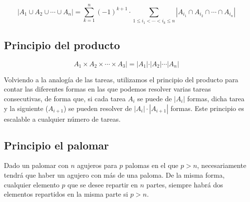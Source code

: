 \[|A_1 \cup A_2 \cup \cdots \cup A_n| = \sum_{k=1}^{n} {(-1)}^{k+1} \cdot \sum_{1 \leq i_1 < \cdots < i_k \leq n} |A_{i_1} \cap A_{i_2} \cap \cdots \cap A_{i_n}|\]

\subsection{Principio del producto}\label{principio-del-producto}

\[A_1 \times A_2 \times \cdots \times A_3| = |A_1| \cdot |A_2| \cdots |A_n|\]

Volviendo a la analogía de las tareas, utilizamos el principio del producto para contar las diferentes formas en las que podemos resolver varias tareas consecutivas, de forma que, si cada tarea $A_i$ se puede de $|A_i|$ formas, dicha tarea y la siguiente ($A_{i+1}$) se pueden resolver de $|A_i| \cdot |A_{i+1}|$ formas.
Este principio es escalable a cualquier número de tareas.

\subsection{Principio el palomar}\label{principio-del-palomar}

Dado un palomar con $n$ agujeros para $p$ palomas en el que $p > n$, necesariamente tendrá que haber un agujero con más de una paloma.
De la misma forma, cualquier elemento $p$ que se desee repartir en $n$ partes, siempre habrá dos elementos repartidos en la misma parte si $p > n$.
